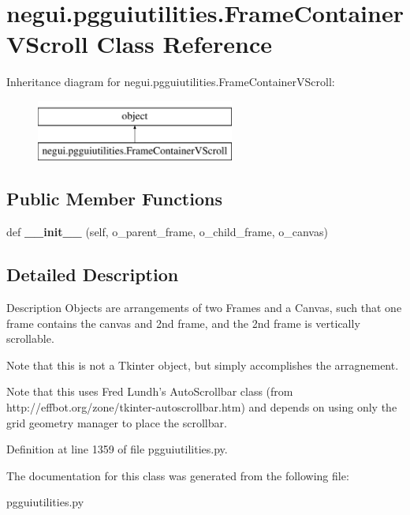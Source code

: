 \hypertarget{classnegui_1_1pgguiutilities_1_1FrameContainerVScroll}{}\section{negui.\+pgguiutilities.\+Frame\+Container\+V\+Scroll Class Reference}
\label{classnegui_1_1pgguiutilities_1_1FrameContainerVScroll}
Inheritance diagram for negui.\+pgguiutilities.\+Frame\+Container\+V\+Scroll\+:\begin{figure}[H]
\begin{center}
\leavevmode
\includegraphics[height=2.000000cm]{classnegui_1_1pgguiutilities_1_1FrameContainerVScroll}
\end{center}
\end{figure}
\subsection*{Public Member Functions}
\begin{DoxyCompactItemize}
\item 
def {\bfseries \+\_\+\+\_\+init\+\_\+\+\_\+} (self, o\+\_\+parent\+\_\+frame, o\+\_\+child\+\_\+frame, o\+\_\+canvas)\hypertarget{classnegui_1_1pgguiutilities_1_1FrameContainerVScroll_a77671bf20cb4175f0788de78bda3445f}{}\label{classnegui_1_1pgguiutilities_1_1FrameContainerVScroll_a77671bf20cb4175f0788de78bda3445f}

\end{DoxyCompactItemize}


\subsection{Detailed Description}
\begin{DoxyVerb}Description
Objects are arrangements of two Frames and a 
Canvas, such that one frame contains the 
canvas and 2nd frame, and the 2nd frame 
is vertically scrollable.

Note that this is not a Tkinter object, but
simply accomplishes the arragnement. 

Note that this uses Fred Lundh's AutoScrollbar class
(from http://effbot.org/zone/tkinter-autoscrollbar.htm)
and depends on using only the grid geometry manager to place
the scrollbar.
\end{DoxyVerb}
 

Definition at line 1359 of file pgguiutilities.\+py.



The documentation for this class was generated from the following file\+:\begin{DoxyCompactItemize}
\item 
pgguiutilities.\+py\end{DoxyCompactItemize}
